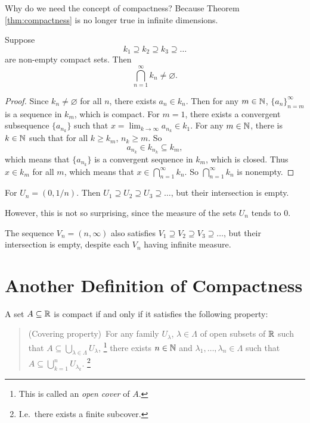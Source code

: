 \begin{remark}
  Why do we need the concept of compactness? Because Theorem
  \ref{thm:compactness} is no longer true in infinite dimensions.
\end{remark}

\begin{theorem}
  Suppose
  \[k_1 \supseteq k_2 \supseteq k_3 \supseteq \dots\]
  are non-empty compact sets. Then
  \[
    \bigcap_{n = 1}^\infty k_n \ne \varnothing
  .\]
\end{theorem}

\begin{proof}
  Since $k_n \ne \varnothing$ for all $n$, there exists
  $a_n \in k_n$. Then for any $m \in \mathbb{N}$,
  $\{a_n\}_{n = m}^\infty$ is a sequence
  in $k_m$, which is compact. For $m = 1$,
  there exists a convergent
  subsequence $\{a_{n_k}\}$ such that
  $x = \lim_{k \to \infty} a_{n_k} \in k_1$. For any
  $m \in \mathbb{N}$, there is $k \in \mathbb{N}$ such that for all
  $k \ge k_m$, $n_k \ge m$. So
  \[a_{n_k} \in k_{n_k} \subseteq k_m,\]
  which means that $\{a_{n_k}\}$ is a convergent sequence
  in $k_m$, which is closed. Thus $x \in k_m$ for all
  $m$, which means that $x \in \bigcap_{n = 1}^\infty k_n$.
  So $\bigcap_{n = 1}^\infty k_n$ is nonempty.
\end{proof}

\begin{example}
  For $U_n = (0, 1 / n)$. Then
  $U_1 \supseteq U_2 \supseteq U_3 \supseteq \dots$, but
  their intersection is empty.
\end{example}

However, this is not so surprising, since the measure of
the sets $U_n$ tends to 0.

\begin{example}
  The sequence $V_n = (n, \infty)$ also satisfies
  $V_1 \supseteq V_2 \supseteq V_3 \supseteq \dots$,
  but their intersection is empty, despite each $V_n$ having
  infinite measure.
\end{example}

\section{Another Definition of Compactness}

\begin{theorem}
  A set $A \subseteq \mathbb{R}$ is compact if and only if
  it satisfies the following property:
  \begin{quote}
    (Covering property)\,
    For any family $U_\lambda$, $\lambda \in \Lambda$ of
    open subsets of $\mathbb{R}$ such that
    $A \subseteq \bigcup_{\lambda \in \Lambda} U_\lambda$,
    \footnote{This is called an \textit{open cover} of $A$.}
    there exists $n \in \mathbb{N}$ and
    $\lambda_1, \dots, \lambda_n \in \Lambda$ such that
    $A \subseteq \bigcup_{k = 1}^n U_{\lambda_k}$.
    \footnote{I.e.~there exists a finite subcover.}
  \end{quote}
\end{theorem}

